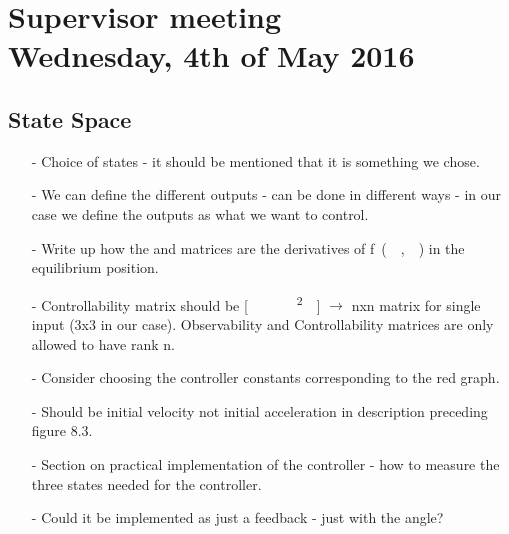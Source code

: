 
\renewcommand{\vec}[1]{\boldsymbol{\mathbf{#1}}}

\renewcommand\chaptername{KAPITEL}
\renewcommand\contentsname{Indhold}
\renewcommand\figurename{Figur}
\renewcommand\tablename{Tabel}

\section*{Supervisor meeting\\ \small Wednesday, 4th of May 2016}

\subsection{State Space}
\begin{itemize}
  \item[-] Choice of states - it should be mentioned that it is something we chose.
  \item[-] We can define the different outputs - can be done in different ways - in our case we define the outputs as what we want to control.
  \item[-] Write up how the \si{\vec{A}} and \si{\vec{B}} matrices are the derivatives of \si{f(\vec{x},\vec{u})} in the equilibrium position.
  \item[-] Controllability matrix should be \si{[\vec{B}\ \vec{AB}\ \vec{A}^2\vec{B}]} $\rightarrow$ nxn matrix for single input (\si{3x3} in our case). Observability and Controllability matrices are only allowed to have rank n.
  \item[-] Consider choosing the controller constants corresponding to the red graph.
  \item[-] Should be initial velocity not initial acceleration in description preceding figure 8.3.
  \item[-] Section on practical implementation of the controller - how to measure the three states needed for the controller.
  \item[-] Could it be implemented as just a feedback - just with the angle?
\end{itemize}

